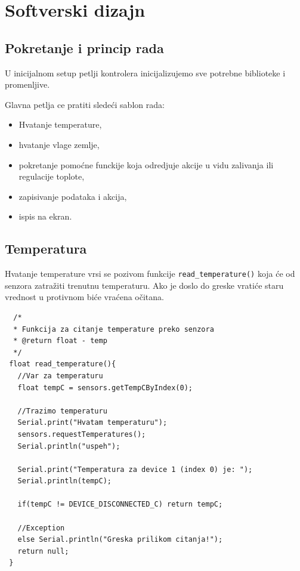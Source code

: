 \documentclass[a4paper,11pt]{book}
\begin{document}
\section{Softverski dizajn}

\subsection{Pokretanje i princip rada}

U inicijalnom setup petlji kontrolera inicijalizujemo sve potrebne biblioteke i promenljive. 

Glavna petlja ce pratiti sledeći sablon rada:

\hrulefill
\begin{itemize}
  \item Hvatanje temperature,
  \item hvatanje vlage zemlje,
  \item pokretanje pomoćne funckije koja odredjuje akcije u vidu zalivanja ili regulacije toplote,
  \item zapisivanje podataka i akcija,
  \item ispis na ekran.
\end{itemize}
\hrulefill

\subsection{Temperatura}

Hvatanje temperature vrsi se pozivom funkcije \verb|read_temperature()| koja će od senzora zatražiti trenutnu temperaturu. Ako je doslo do greske vratiće staru vrednost u protivnom biće vraćena očitana. 

\begin{lstlisting}
  /*
  * Funkcija za citanje temperature preko senzora
  * @return float - temp
  */
 float read_temperature(){
   //Var za temperaturu
   float tempC = sensors.getTempCByIndex(0);
   
   //Trazimo temperaturu
   Serial.print("Hvatam temperaturu");
   sensors.requestTemperatures();
   Serial.println("uspeh");
 
   Serial.print("Temperatura za device 1 (index 0) je: ");
   Serial.println(tempC);
 
   if(tempC != DEVICE_DISCONNECTED_C) return tempC;
 
   //Exception
   else Serial.println("Greska prilikom citanja!");
   return null;
 }
\end{lstlisting}
  
\end{document}
